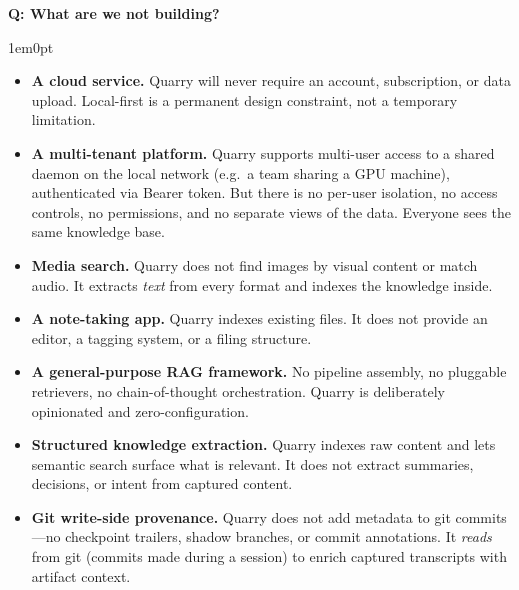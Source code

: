 \documentclass[11pt,letterpaper]{article}
\newcounter{faqnum}
\newenvironment{faqpair}[1]{%
  \needspace{4\baselineskip}%
  \vspace{0.5em}%
  \refstepcounter{faqnum}%
  \noindent\textbf{\color{SectionBlue}Q\thefaqnum: #1}\par\nopagebreak[4]%
  \vspace{0.2em}%
  \begin{adjustwidth}{1em}{0pt}%
  \setlength{\parindent}{0pt}%
}{%
  \end{adjustwidth}%
  \vspace{0.5em}%
}
\begin{document}
\begin{faqpair}{What are we not building?}\label{faq:not-building}
  \begin{itemize}[leftmargin=1.5em, nosep]
    \item \textbf{A cloud service.} Quarry will never require an account,
          subscription, or data upload. Local-first is a permanent design
          constraint, not a temporary limitation.
    \item \textbf{A multi-tenant platform.} Quarry supports multi-user access
          to a shared daemon on the local network (e.g.\ a team sharing a
          GPU machine), authenticated via Bearer token. But there is no
          per-user isolation, no access controls, no permissions, and no
          separate views of the data. Everyone sees the same knowledge base.
    \item \textbf{Media search.} Quarry does not find images by visual content
          or match audio. It extracts \emph{text} from every format and indexes
          the knowledge inside.
    \item \textbf{A note-taking app.} Quarry indexes existing files. It does not
          provide an editor, a tagging system, or a filing structure.
    \item \textbf{A general-purpose RAG framework.} No pipeline assembly, no
          pluggable retrievers, no chain-of-thought orchestration. Quarry is
          deliberately opinionated and zero-configuration.
    \item \textbf{Structured knowledge extraction.} Quarry indexes raw content
          and lets semantic search surface what is relevant. It does not extract
          summaries, decisions, or intent from captured content.
    \item \textbf{Git write-side provenance.} Quarry does not add metadata to
          git commits---no checkpoint trailers, shadow branches, or commit
          annotations. It \emph{reads} from git (commits made during a session)
          to enrich captured transcripts with artifact context.
  \end{itemize}
\end{faqpair}
\end{document}
